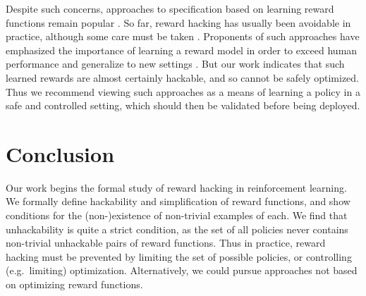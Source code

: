 \documentclass{article}
\theoremstyle{definition}
\theoremstyle{remark}
\begin{document}
Despite such concerns, approaches to specification based on learning reward functions %
remain popular \citep{fu2017learning, Stiennon2020Learning, nakano2021webgpt}.
So far, reward hacking has usually been avoidable in practice, although some care must be taken \citep{Stiennon2020Learning}.
Proponents of such approaches have emphasized the importance of learning a reward model in order to exceed human performance and generalize to new settings \citep{brown2020better, leike2018scalable}.
But our work indicates that such learned rewards are almost certainly hackable, and so cannot be safely optimized.
Thus we recommend viewing such approaches as a means of learning a policy in a safe and controlled setting, which should then be validated before being deployed.


















































 


\section{Conclusion}
Our work begins the formal study of reward hacking in reinforcement learning.
We formally define hackability and simplification of reward functions, and show conditions for the (non-)existence of non-trivial examples of each.
We find that unhackability is quite a strict condition, as the set of all policies never contains non-trivial unhackable pairs of reward functions.
Thus in practice, reward hacking must be prevented by limiting the set of possible policies, or controlling (e.g.\ limiting) optimization.
Alternatively, we could %
pursue approaches not based on optimizing reward functions.
\end{document}
